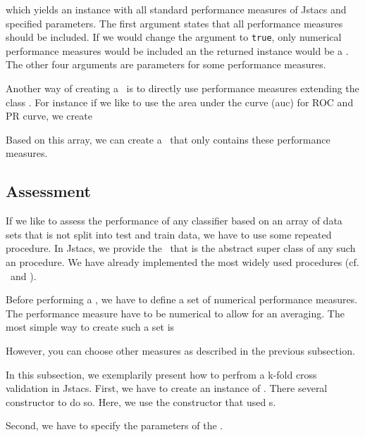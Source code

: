 which yields an instance with all standard performance measures of Jstacs and specified parameters. The first argument states that all performance measures should be included. If we would change the argument to \lstinline+true+, only numerical performance measures would be included an the returned instance would be a \NumericalPerformanceMeasureParameterSet. The other four arguments are parameters for some performance measures.

Another way of creating a \PerformanceMeasureParameterSet~is to directly use performance measures extending the class \AbstractPerformanceMeasure. For instance if we like to use the area under the curve (auc) for ROC and PR curve, we create 

\addtocounter{off}{1}

Based on this array, we can create a \PerformanceMeasureParameterSet~that only contains these performance measures.

\addtocounter{off}{1}

\subsection{Assessment}\label{Assessment}

If we like to assess the performance of any classifier based on an array of data sets that is not split into test and train data, we have to use some repeated procedure. In Jstacs, we provide the \ClassifierAssessment~that is the abstract super class of any such an procedure. We have already implemented the most widely used procedures (cf. \KFoldCrossValidation~and \RepeatedHoldOutExperiment).

Before performing a \ClassifierAssessment, we have to define a set of numerical performance measures. The performance measure have to be numerical to allow for an averaging. The most simple way to create such a set is
\addtocounter{off}{6}
However, you can choose other measures as described in the previous subsection.

In this subsection, we exemplarily present how to perfrom a k-fold cross validation in Jstacs. First, we have to create an instance of \KFoldCrossValidation. There several constructor to do so. Here, we use the constructor that used \AbstractClassifier s. 

\addtocounter{off}{2}

Second, we have to specify the parameters of the \KFoldCrossValidation.


